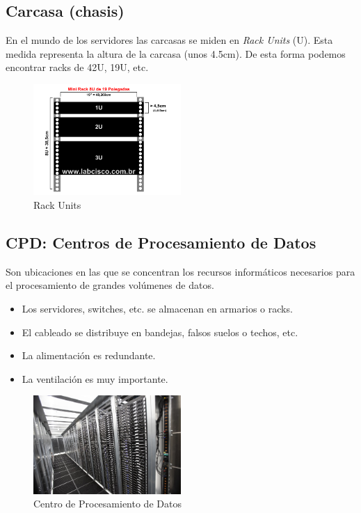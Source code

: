 \documentclass[12pt,spanish]{article}
\begin{document}
\subsection{Carcasa (chasis)}
En el mundo de los servidores las carcasas se miden en \emph{Rack Units} (U). Esta medida representa la altura de la carcasa (unos 4.5cm). De esta forma podemos encontrar racks de 42U, 19U, etc.
\begin{figure}[H]
	\centering
	\includegraphics[width=0.5\textwidth]{rackunits.png}
	\caption{Rack Units}
\end{figure}
\subsection{CPD: Centros de Procesamiento de Datos}
Son ubicaciones en las que se concentran los recursos informáticos necesarios para el procesamiento de grandes volúmenes de datos.
\begin{itemize}
	\item Los servidores, switches, etc. se almacenan en armarios o racks.
	\item El cableado se distribuye en bandejas, falsos suelos o techos, etc.
	\item La alimentación es redundante.
	\item La ventilación es muy importante.
\end{itemize}

\begin{figure}[H]
	\centering
	\includegraphics[width=0.5\textwidth]{cpd.jpg}
	\caption{Centro de Procesamiento de Datos}
\end{figure}
\newpage
\end{document}
